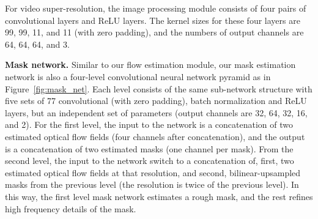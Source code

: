 \documentclass[twocolumn,natbib]{svjour3}          \smartqed  \usepackage{graphicx}
\newcommand{\fig}[1]{Figure~\ref{#1}}
\newcommand{\myparagraph}[1]{\vspace{5pt}\noindent\textbf{#1}}
\begin{document}
For video super-resolution, the image processing module 
consists of four pairs of convolutional layers and ReLU layers. The kernel sizes for these four layers are 99, 99, 11, and 11 (with zero padding), and the numbers of output channels are 64, 64, 64, and 3.


\myparagraph{Mask network. } Similar to our flow estimation module, our mask estimation network is also a four-level convolutional neural network pyramid as in \fig{fig:mask_net}. Each level consists of the same sub-network structure with five sets of 77 convolutional (with zero padding), batch normalization and ReLU layers, but an independent set of parameters (output channels are 32, 64, 32, 16, and 2). For the first level, the input to the network is a concatenation of two estimated optical flow fields (four channels after concatenation), and the output is a concatenation of two estimated masks (one channel per mask). From the second level, the input to the network switch to a concatenation of, first, two estimated optical flow fields at that resolution, and second, bilinear-upsampled masks from the previous level (the resolution is twice of the previous level). In this way, the first level mask network estimates a rough mask, and the rest refines high frequency details of the mask. 
\end{document}

